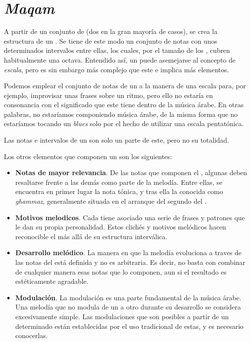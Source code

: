 \section{\emph{Maqam}}

A partir de un conjunto de \ashnas (dos en la gran mayoría de casos), se crea la estructura de un \maqamb. Se tiene de este modo un conjunto de notas con unos determinados intervalos entre ellas, los cuales, por el tamaño de los \ashnasb, cubren habitualmente una octava. Entendido así, un \maqam puede asemejarse al concepto de \emph{escala}, pero es sin embargo más complejo que este e implica más elementos.

Podemos emplear el conjunto de notas de un \maqam a la manera de una escala para, por ejemplo, improvisar unas frases sobre un ritmo, pero ello no estaría en consonancia con el significado que este tiene dentro de la música árabe. En otras palabras, no estaríamos componiendo música árabe, de la misma forma que no estaríamos tocando un \emph{blues} solo por el hecho de utilizar una escala pentatónica.

Las notas e intervalos de un \maqam son solo un parte de este, pero no su totalidad.

Los otros elementos que componen un \maqam son los siguientes:

\begin{itemize}
\item \textbf{Notas de mayor relevancia}. De las notas que componen el \maqam, algunas deben resaltarse frente a las demás como parte de la melodía. Entre ellas, se encuentra en primer lugar la nota tónica, y tras ella la conocida como \emph{ghammaz}, generalmente situada en el arranque del segundo \yins del \maqamb.
\item \textbf{Motivos melodicos}. Cada \maqam tiene asociado una serie de frases y patrones que le dan su propia personalidad. Estos clichés y motivos melódicos hacen reconocible el \maqam más allá de su estructura interválica.
\item \textbf{Desarrollo melódico}. La manera en que la melodía evoluciona a traves de las notas del \maqam está definida  y no es arbitraria. Es decir, no basta con combinar de cualquier manera esas notas que lo componen, aun si el resultado es estéticamente agradable.
\item \textbf{Modulación}. La modulación es una parte fundamental de la música árabe. Una melodía que no modula de un \maqam a otro durante su desarrollo se considera excesivamente simple. Las modulaciones que son posibles a partir de un determinado \maqam están establecidas por el uso tradicional de estas, y es necesario conocerlas.
\end{itemize}

